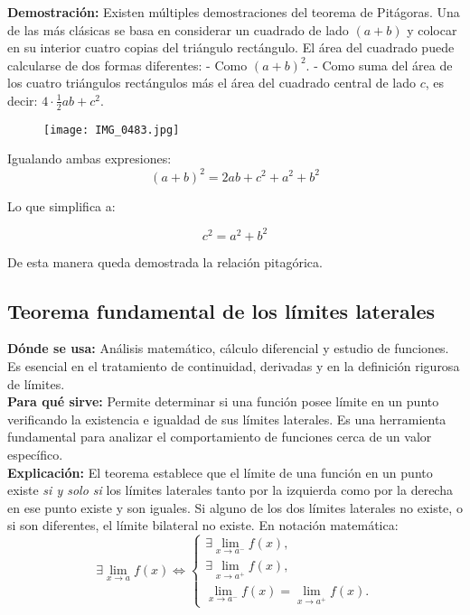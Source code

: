 \textbf{Demostración:}  
Existen múltiples demostraciones del teorema de Pitágoras. Una de las más clásicas se basa en considerar un cuadrado de lado $(a+b)$ y colocar en su interior cuatro copias del triángulo rectángulo. El área del cuadrado puede calcularse de dos formas diferentes:  
- Como $(a+b)^2$.  
- Como suma del área de los cuatro triángulos rectángulos más el área del cuadrado central de lado $c$, es decir: $4\cdot\frac{1}{2}ab + c^2$.  

\begin{figure}[h]
    \centering
    \texttt{[image: IMG\_0483.jpg]}
    \label{fig:pitagoras}
\end{figure}

Igualando ambas expresiones:
\[
(a+b)^2 = 2ab + c^2 + a^2 + b^2
\]

Lo que simplifica a:

\[
c^2 = a^2 + b^2
\]

De esta manera queda demostrada la relación pitagórica.

\cleardoublepage

\subsection*{Teorema fundamental de los límites laterales}

\textbf{Dónde se usa:}  
Análisis matemático, cálculo diferencial y estudio de funciones. Es esencial en el tratamiento de continuidad, derivadas y en la definición rigurosa de límites.\\

\textbf{Para qué sirve:}  
Permite determinar si una función posee límite en un punto verificando la existencia e igualdad de sus límites laterales. Es una herramienta fundamental para analizar el comportamiento de funciones cerca de un valor específico.\\

\textbf{Explicación:}  
El teorema establece que el límite de una función en un punto existe \emph{si y solo si} los límites laterales tanto por la izquierda como por la derecha en ese punto existe y son iguales.  
Si alguno de los dos límites laterales no existe, o si son diferentes, el límite bilateral no existe.  
En notación matemática:
\[
\exists\lim_{x \to a} f(x)  \iff 
\begin{cases}
\exists \lim\limits_{x \to a^-} f(x), \\[6pt]
\exists \lim\limits_{x \to a^+} f(x), \\[6pt]
\lim\limits_{x \to a^-} f(x) = \lim\limits_{x \to a^+} f(x).
\end{cases}
\]

